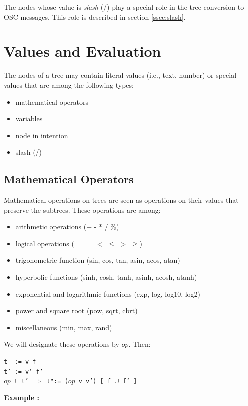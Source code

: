 \documentclass{article}
\newcommand{\exemple}	{\vspace*{1mm}\hspace*{-4mm}\textbf{Example :}}
\newcommand{\op}	[1]		{\vspace{0mm}\begin{center}\colorbox{mygrey}{
							\begin{minipage}[t]{0.9\columnwidth} 
							{\small \texttt{#1}}
							\end{minipage}}\end{center}}
\newcommand{\binop}		{$op$}
\begin{document}
The nodes whose value is \emph{slash} (/) play a special role in the tree conversion to OSC messages. This role is described in section \ref{ssec:slash}.

\section{Values and Evaluation}\label{sec:valeurs}

The nodes of a tree may contain literal values (i.e., text, number) or special values that are among the following types:
\begin{itemize}
 \setlength\itemsep{0.0em}
\item mathematical operators
\item variables
\item node in intention
\item slash (/)
\end{itemize}



\subsection{Mathematical Operators}

Mathematical operations on trees are seen as operations on their values that preserve the subtrees. These operations are among:
\begin{itemize}
 \setlength\itemsep{0.0em}
\item arithmetic operations (+ - * / \%)
\item logical operations ($==$ $<$ $\leq$ $>$ $\geq$)
\item trigonometric function (sin, cos, tan, asin, acos, atan)
\item hyperbolic functions (sinh, cosh, tanh, asinh, acosh, atanh)
\item exponential and logarithmic functions (exp, log, log10, log2)
\item power and square root (pow, sqrt, cbrt)
\item miscellaneous  (min, max, rand)
\end{itemize}

We will designate these operations by \binop. Then:
\op{t\ \ :=  v f\\
t' := v' f'\\
\binop\ t t'  $\Rightarrow$  t":=  (\binop\ v v') [ f $\cup$ f' ]  
}

\exemple
\end{document}
